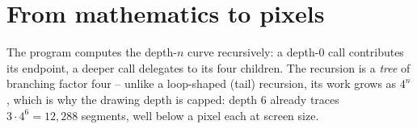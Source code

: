 \documentclass[11pt]{article}
\begin{document}
\section{From mathematics to pixels}

The program computes the depth-$n$ curve recursively: a depth-$0$ call
contributes its endpoint, a deeper call delegates to its four children. The
recursion is a \emph{tree} of branching factor four -- unlike a loop-shaped
(tail) recursion, its work grows as $4^n$, which is why the drawing depth is
capped: depth $6$ already traces $3 \cdot 4^6 = 12{,}288$ segments, well
below a pixel each at screen size.
\end{document}
